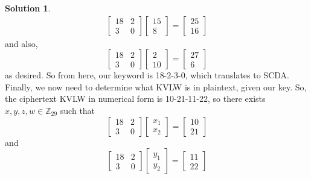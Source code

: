 \documentclass[11pt]{article}
\theoremstyle{definition}\newtheorem{definition}{Definition}
\theoremstyle{definition}\newtheorem{question}{Question}
\theoremstyle{definition}\newtheorem*{solution}{Solution}
\theoremstyle{definition}\newtheorem{example}{Example}
\theoremstyle{definition}\newtheorem{notation}{Notation}
\theoremstyle{theorem}\newtheorem{theorem}{Theorem}
\theoremstyle{theorem}\newtheorem{corollary}{Corollary}
\theoremstyle{theorem}\newtheorem{lemma}{Lemma}
\theoremstyle{theorem}\newtheorem{proposition}{Proposition}
\newcommand{\Z}{\mathbb{Z}}
\begin{document}
\begin{solution}
    \begin{align*}
        \begin{bmatrix} 18 & 2 \\ 3 & 0 \end{bmatrix} \begin{bmatrix} 15 \\ 8 \end{bmatrix} = \begin{bmatrix} 25 \\ 16 \end{bmatrix}
    \end{align*}
    and also,
    \begin{equation*}
        \begin{bmatrix} 18 & 2 \\ 3 & 0 \end{bmatrix} \begin{bmatrix} 2 \\ 10 \end{bmatrix} = \begin{bmatrix} 27 \\ 6 \end{bmatrix}
    \end{equation*}
    as desired. So from here, our keyword is 18-2-3-0, which translates to SCDA. Finally, we now need to determine what KVLW is in plaintext, given our key. So, the ciphertext KVLW in numerical form is 10-21-11-22, so there exists $x, y, z, w \in \Z_{29}$ such that
    \begin{equation*}
        \begin{bmatrix} 18 & 2 \\ 3 & 0 \end{bmatrix} \begin{bmatrix} x_1 \\ x_2 \end{bmatrix} = \begin{bmatrix} 10 \\ 21 \end{bmatrix}
    \end{equation*}
    and
    \begin{equation*}
        \begin{bmatrix} 18 & 2 \\ 3 & 0 \end{bmatrix} \begin{bmatrix} y_1 \\ y_2 \end{bmatrix} = \begin{bmatrix} 11 \\ 22 \end{bmatrix}

\end{equation*}
\end{solution}
\end{document}
